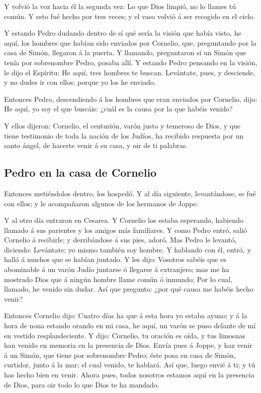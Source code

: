  Y volvió la voz hacia él la segunda vez: Lo que Dios
limpió, no lo llames tú común.  Y esto fué hecho por tres
veces; y el vaso volvió á ser recogido en el cielo.

 Y estando Pedro dudando dentro de sí qué sería la visión
que había visto, he aquí, los hombres que habían sido enviados por
Cornelio, que, preguntando por la casa de Simón, llegaron á la puerta.
 Y llamando, preguntaron si un Simón que tenía por
sobrenombre Pedro, posaba allí.  Y estando Pedro pensando
en la visión, le dijo el Espíritu: He aquí, tres hombres te buscan.
 Levántate, pues, y desciende, y no dudes ir con ellos;
porque yo los he enviado.

 Entonces Pedro, descendiendo á los hombres que eran
enviados por Cornelio, dijo: He aquí, yo soy el que buscáis: ¿cuál es la
causa por la que habéis venido?

 Y ellos dijeron: Cornelio, el centurión, varón justo y
temeroso de Dios, y que tiene testimonio de toda la nación de los
Judíos, ha recibido respuesta por un santo ángel, de hacerte venir á su
casa, y oir de ti palabras.

\hypertarget{pedro-en-la-casa-de-cornelio}{%
\subsection{Pedro en la casa de
Cornelio}\label{pedro-en-la-casa-de-cornelio}}

 Entonces metiéndolos dentro, los hospedó. Y al día
siguiente, levantándose, se fué con ellos; y le acompañaron algunos de
los hermanos de Joppe.

 Y al otro día entraron en Cesarea. Y Cornelio los estaba
esperando, habiendo llamado á sus parientes y los amigos más familiares.
 Y como Pedro entró, salió Cornelio á recibirle; y
derribándose á sus pies, adoró.  Mas Pedro le levantó,
diciendo: Levántate; yo mismo también soy hombre.  Y
hablando con él, entró, y halló á muchos que se habían juntado.
 Y les dijo: Vosotros sabéis que es abominable á un varón
Judío juntarse ó llegarse á extranjero; mas me ha mostrado Dios que á
ningún hombre llame común ó inmundo;  Por lo cual,
llamado, he venido sin dudar. Así que pregunto: ¿por qué causa me habéis
hecho venir?

 Entonces Cornelio dijo: Cuatro días ha que á esta hora
yo estaba ayuno; y á la hora de nona estando orando en mi casa, he aquí,
un varón se puso delante de mí en vestido resplandeciente.
 Y dijo: Cornelio, tu oración es oída, y tus limosnas han
venido en memoria en la presencia de Dios.  Envía pues á
Joppe, y haz venir á un Simón, que tiene por sobrenombre Pedro; éste
posa en casa de Simón, curtidor, junto á la mar; el cual venido, te
hablará.  Así que, luego envié á ti; y tú has hecho bien
en venir. Ahora pues, todos nosotros estamos aquí en la presencia de
Dios, para oir todo lo que Dios te ha mandado.

